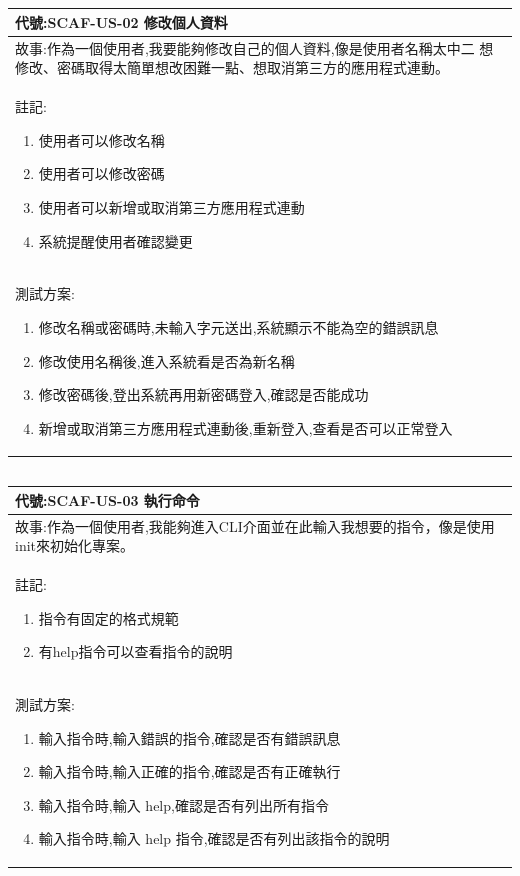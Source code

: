 \documentclass{report}
\begin{document}
\subsection*{}
\fontsize{12}{20}\selectfont
\begin{tabularx}{\textwidth}{|X|}
  \hline
  代號:SCAF-US-02 修改個人資料 \\
  \hline
  故事:作為一個使用者,我要能夠修改自己的個人資料,像是使用者名稱太中二
想修改、密碼取得太簡單想改困難一點、想取消第三方的應用程式連動。 \\
  \hline
  註記:
  \begin{enumerate}
    \item 使用者可以修改名稱
    \item 使用者可以修改密碼
    \item 使用者可以新增或取消第三方應用程式連動
    \item 系統提醒使用者確認變更
  \end{enumerate} \\
  \hline
  測試方案:
  \begin{enumerate}
    \item 修改名稱或密碼時,未輸入字元送出,系統顯示不能為空的錯誤訊息
    \item 修改使用名稱後,進入系統看是否為新名稱
    \item 修改密碼後,登出系統再用新密碼登入,確認是否能成功
    \item 新增或取消第三方應用程式連動後,重新登入,查看是否可以正常登入
  \end{enumerate} \\
  \hline
\end{tabularx}

\subsection*{}
\fontsize{12}{20}\selectfont
\begin{tabularx}{\textwidth}{|X|}
  \hline
  代號:SCAF-US-03 執行命令 \\
  \hline
  故事:作為一個使用者,我能夠進入CLI介面並在此輸入我想要的指令，像是使用init來初始化專案。 \\
  \hline
  註記:
  \begin{enumerate}
    \item 指令有固定的格式規範
    \item 有help指令可以查看指令的說明
  \end{enumerate} \\
  \hline
  測試方案:
  \begin{enumerate}
    \item 輸入指令時,輸入錯誤的指令,確認是否有錯誤訊息
    \item 輸入指令時,輸入正確的指令,確認是否有正確執行
    \item 輸入指令時,輸入 help,確認是否有列出所有指令
    \item 輸入指令時,輸入 help 指令,確認是否有列出該指令的說明
  \end{enumerate} \\
  \hline
\end{tabularx}
\end{document}
